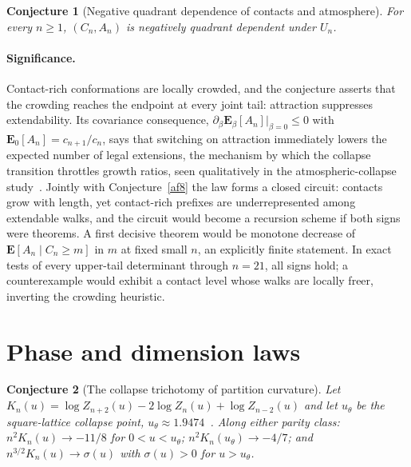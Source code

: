\documentclass[11pt]{article}
\newtheorem{conjecture}{Conjecture}
\theoremstyle{definition}
\begin{document}
\begin{conjecture}[Negative quadrant dependence of contacts and atmosphere]\label{af12}
For every $n\ge1$, $(C_n,A_n)$ is negatively quadrant dependent under $U_n$.
\end{conjecture}

\paragraph{Significance.}
Contact-rich conformations are locally crowded, and the conjecture asserts that the crowding reaches the endpoint at every joint tail: attraction suppresses extendability.  Its covariance consequence, $\partial_\beta\mathbf E_\beta[A_n]\big|_{\beta=0}\le0$ with $\mathbf E_0[A_n]=c_{n+1}/c_n$, says that switching on attraction immediately lowers the expected number of legal extensions, the mechanism by which the collapse transition throttles growth ratios, seen qualitatively in the atmospheric-collapse study~\cite{AJvR09}.  Jointly with Conjecture~\ref{af8} the law forms a closed circuit: contacts grow with length, yet contact-rich prefixes are underrepresented among extendable walks, and the circuit would become a recursion scheme if both signs were theorems.  A first decisive theorem would be monotone decrease of $\mathbf E[A_n\mid C_n\ge m]$ in $m$ at fixed small $n$, an explicitly finite statement.  In exact tests of every upper-tail determinant through $n=21$, all signs hold; a counterexample would exhibit a contact level whose walks are locally freer, inverting the crowding heuristic.

\section{Phase and dimension laws}

\begin{conjecture}[The collapse trichotomy of partition curvature]\label{af13}
Let $K_n(u)=\log Z_{n+2}(u)-2\log Z_n(u)+\log Z_{n-2}(u)$ and let $u_\theta$ be the square-lattice collapse point, $u_\theta\approx1.9474$~\cite{BGJ20}.  Along either parity class: $n^2K_n(u)\to-11/8$ for $0<u<u_\theta$; $n^2K_n(u_\theta)\to-4/7$; and $n^{3/2}K_n(u)\to\sigma(u)$ with $\sigma(u)>0$ for $u>u_\theta$.
\end{conjecture}
\end{document}
